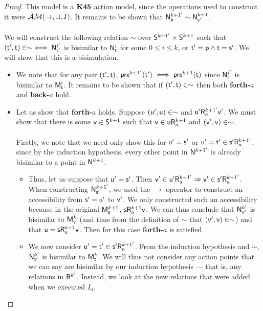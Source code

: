 \begin{proof}
  This model is a $\AXKFF$ action model, since the operations used to construct
  it were $\EM(\to,\sqcup,I)$.
  It remains to be shown that $\evM^{k+1'}_{\evp} \sim \evM^{k+1}_{\evs'}$.\\
  \\
  We will construct the following relation $\sim$ over $\evS^{k+1'} \times
  \evS^{k+1}$ such that $(\evt',\evt) \in \sim \iff \evM^{i'}_{\evt'}$ is bisimilar to
	$\evM^{i}_{\evt}$ for some $0 \leq i \leq k$, or $\evt' = \evp \land \evt =
  \evs'$.
  We will show that this is a bisimulation.
	\begin{itemize}
		\item We note that for any pair $(\evt',\evt)$, $\evpr^{k+1'}(\evt') \iff
  \evpr^{k+1}(\evt)$ since $\evM^{i'}_{\evt'}$ is bisimilar to $\evMM^{i}_{\evt}$.
  It remains to be shown that if $(\evt', \evt) \in \sim$ then both {\bf
  forth-$a$} and {\bf back-$a$} hold.
		\item Let us show that {\bf forth-$a$} holds.
	Suppose $(\evu',\evu) \in \sim$ and $\evu' \evR^{k+1'}_a \evv'$.
	We must show that there is some $\evv \in \evS^{k+1}$ such that $\evv \in \evu \evR^{k+1}_a$ and
	$(\evv',\evv) \in \sim$.\\
	\\
	Firstly, we note that we need only show this for $\evu' = \evs'$ or $\evu' = \evt' \in \evs'
	\evR^{k+1'}_a$, since by
	the induction hypothesis, every other point in $\evM^{k+1'}$ is already bisimilar to a point in
	$\evM^{k+1}$.
	\begin{itemize}
		\item Thus, let us suppose that $\evu' = \evs'$.
	Then $\evv' \in \evu' \evR^{k+1'}_a \Rightarrow \evv' \in \evs' \evR^{k+1'}_a$.
	When constructing $\evM^{k+1'}_{\evs'}$, we used the $\to$ operator to construct an accessibility
	from $\evs' = \evu'$ to $\evv'$.
	We only constructed such an accessibility because in the original $\evMM^{k+1}_\evs$, $\evs
	\evR^{k+1}_a \evv$.
	We can thus conclude that $\evM^{k'}_{\evv'}$ is bisimilar to $\evMM^k_\evv$ (and thus from the
	definition of $\sim$ that $(\evv',\evv) \in \sim$) and that $\evu = \evs \evR^{k+1}_a \evv$.
	Then for this case {\bf forth-$a$} is satisfied.
		\item We now consider $\evu' = \evt' \in \evs' \evR^{k+1'}_a$.
	From the induction hypothesis and $\sim$, $\evM^{k'}_{\evt'}$ is bisimilar to $\evMM^{k}_{\evt}$.
	We will thus not consider any action points that we can say are bisimilar by our induction
	hypothesis --- that is, any relations in $\evR^{k'}$.
	Instead, we look at the new relations that were added when we executed $I_a$.\\

\end{itemize}
\end{itemize}
\end{proof}
